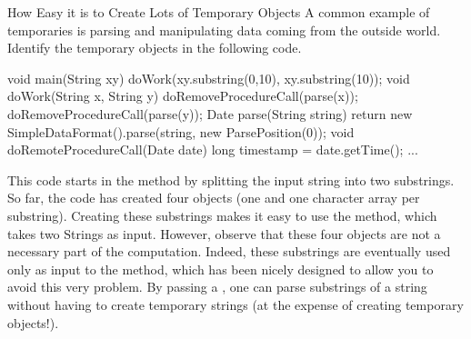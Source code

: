 
\begin{example}{How Easy it is to Create Lots of Temporary Objects}
A common example of temporaries is parsing
and manipulating data coming from the outside world. Identify the temporary
objects in the following code.

\begin{shortlisting}%
void main(String xy) {
	doWork(xy.substring(0,10), xy.substring(10));
}	
void doWork(String x, String y) {
	doRemoveProcedureCall(parse(x));
	doRemoveProcedureCall(parse(y));
}
Date parse(String string) {
	return new SimpleDataFormat().parse(string, new ParsePosition(0));
}
void doRemoteProcedureCall(Date date) {
	long timestamp = date.getTime();
	...
}
\end{shortlisting}
\end{example} 

This code starts in the  method by splitting the input string into two
substrings. So far, the code has created four objects (one  and one
character array per substring). Creating these substrings makes it easy to use
the  method, which takes two Strings as input. However, observe that
these four objects are not a necessary part of the computation. Indeed, these
substrings are eventually used only as input to the 
 method, which has been nicely designed to allow you to avoid this
very problem. By passing a , one can parse substrings of a
string without having to create temporary strings (at the expense of creating
temporary  objects!).




